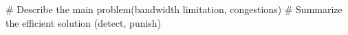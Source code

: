 \documentclass[thesis.tex]{subfiles}
\begin{document}
    \begin{easylist}
        \MyListProperties
        # Describe the main problem(bandwidth limitation, congestions)
        # Summarize the efficient solution (detect, punish)
    \end{easylist}
\end{document}
